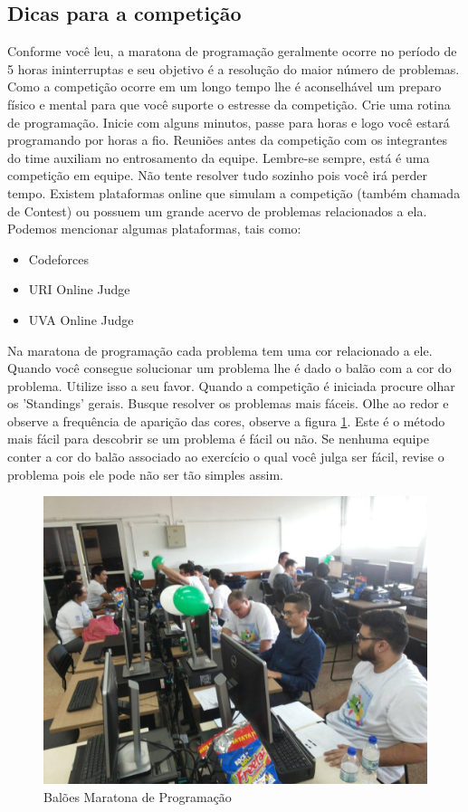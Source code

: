 \subsection{Dicas para a competição}
Conforme você leu, a maratona de programação geralmente ocorre no período de 5 horas ininterruptas e seu objetivo é a resolução do maior número de problemas. Como a competição ocorre em um longo tempo lhe é aconselhável um preparo físico e mental para que você suporte o estresse da competição. Crie uma rotina de programação. Inicie com alguns minutos, passe para horas e logo você estará programando por horas a fio. Reuniões antes da competição com os integrantes do time auxiliam no entrosamento da equipe. Lembre-se sempre, está é uma competição em equipe. Não tente resolver tudo sozinho pois você irá perder tempo. Existem plataformas online que simulam a competição (também chamada de Contest) ou possuem um grande acervo de problemas relacionados a ela. Podemos mencionar algumas plataformas, tais como:
\begin{itemize}
    \item Codeforces
    \item URI Online Judge
    \item UVA Online Judge
\end{itemize}
Na maratona de programação cada problema tem uma cor relacionado a ele. Quando você consegue solucionar um problema lhe é dado o balão com a cor do problema. Utilize isso a seu favor. Quando a competição é iniciada procure olhar os 'Standings' gerais. Busque resolver os problemas mais fáceis. Olhe ao redor e observe a frequência de aparição das cores, observe a figura \ref{fig:balao}. Este é o método mais fácil para descobrir se um problema é fácil ou não. Se nenhuma equipe conter a cor do balão associado ao exercício o qual você julga ser fácil, revise o problema pois ele pode não ser tão simples assim.

\begin{figure}
    \centering
    \includegraphics{image/balao.jpg}
    \caption{Balões Maratona de Programação}
    \label{fig:balao}
\end{figure}
